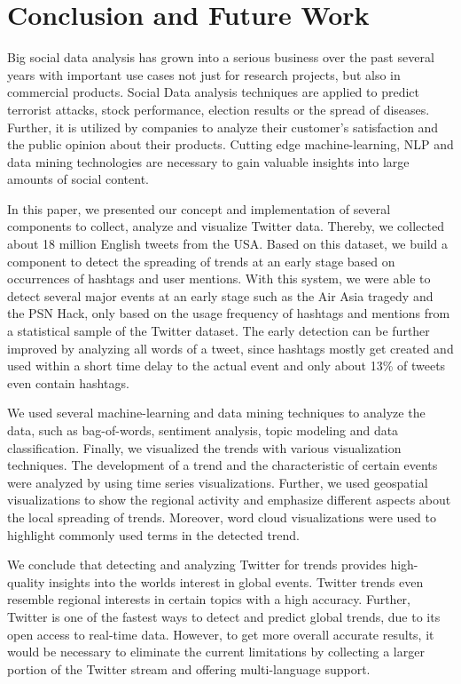
\chapter{Conclusion and Future Work}
\label{cha:conclusion-future-work}
Big social data analysis has grown into a serious business over the past several years with important use cases not just for research projects, but also in commercial products. Social Data analysis techniques are applied to predict terrorist attacks, stock performance, election results or the spread of diseases. Further, it is utilized by companies to analyze their customer’s satisfaction and the public opinion about their products. Cutting edge machine-learning, NLP and data mining technologies are necessary to gain valuable insights into large amounts of social content.

In this paper, we presented our concept and implementation of several components to collect, analyze and visualize Twitter data. Thereby, we collected about 18 million English tweets from the USA. Based on this dataset, we build a component to detect the spreading of trends at an early stage based on occurrences of hashtags and user mentions. With this system, we were able to detect several major events at an early stage such as the Air Asia tragedy and the PSN Hack, only based on the usage frequency of hashtags and mentions from a statistical sample of the Twitter dataset. The early detection can be further improved by analyzing all words of a tweet, since hashtags mostly get created and used within a short time delay to the actual event and only about 13\% of tweets even contain hashtags.


We used several machine-learning and data mining techniques to analyze the data, such as bag-of-words, sentiment analysis, topic modeling and data classification. Finally, we visualized the trends with various visualization techniques. The development of a trend and the characteristic of certain events were analyzed by using time series visualizations. Further, we used geospatial visualizations to show the regional activity and emphasize different aspects about the local spreading of trends. Moreover, word cloud visualizations were used to highlight commonly used terms in the detected trend.

We conclude that detecting and analyzing Twitter for trends provides high-quality insights into the worlds interest in global events. Twitter trends even resemble regional interests in certain topics with a high accuracy. Further, Twitter is one of the fastest ways to detect and predict global trends, due to its open access to real-time data. However, to get more overall accurate results, it would be necessary to eliminate the current limitations by collecting a larger portion of the Twitter stream and offering multi-language support.
